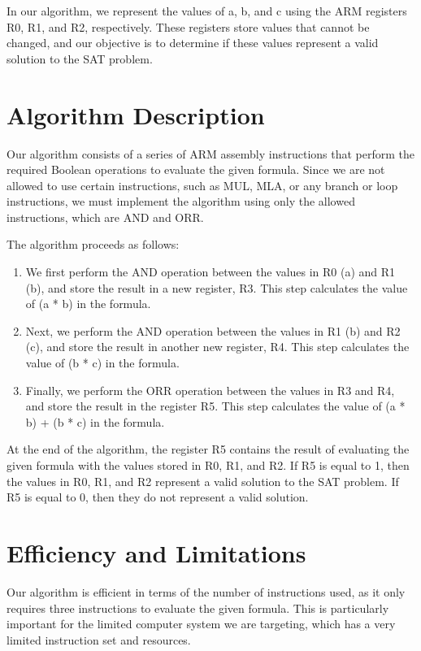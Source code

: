 In our algorithm, we represent the values of a, b, and c using the ARM registers R0, R1, and R2, respectively. These registers store values that cannot be changed, and our objective is to determine if these values represent a valid solution to the SAT problem.

\section{Algorithm Description}

Our algorithm consists of a series of ARM assembly instructions that perform the required Boolean operations to evaluate the given formula. Since we are not allowed to use certain instructions, such as MUL, MLA, or any branch or loop instructions, we must implement the algorithm using only the allowed instructions, which are AND and ORR.

The algorithm proceeds as follows:

\begin{enumerate}
    \item We first perform the AND operation between the values in R0 (a) and R1 (b), and store the result in a new register, R3. This step calculates the value of (a * b) in the formula.
    
    \item Next, we perform the AND operation between the values in R1 (b) and R2 (c), and store the result in another new register, R4. This step calculates the value of (b * c) in the formula.
    
    \item Finally, we perform the ORR operation between the values in R3 and R4, and store the result in the register R5. This step calculates the value of (a * b) + (b * c) in the formula.
\end{enumerate}

At the end of the algorithm, the register R5 contains the result of evaluating the given formula with the values stored in R0, R1, and R2. If R5 is equal to 1, then the values in R0, R1, and R2 represent a valid solution to the SAT problem. If R5 is equal to 0, then they do not represent a valid solution.

\section{Efficiency and Limitations}

Our algorithm is efficient in terms of the number of instructions used, as it only requires three instructions to evaluate the given formula. This is particularly important for the limited computer system we are targeting, which has a very limited instruction set and resources.

